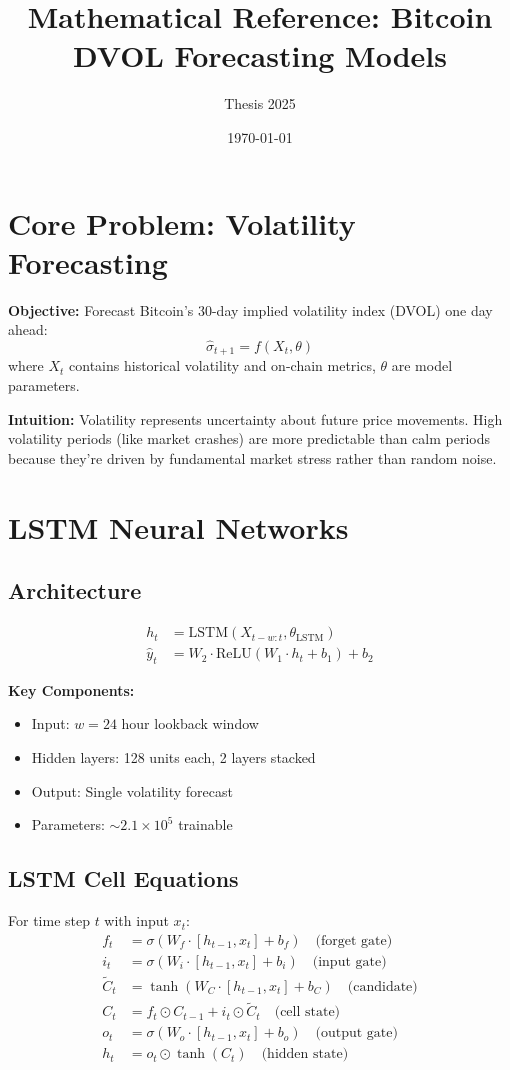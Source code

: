 \documentclass{article}
\title{Mathematical Reference: Bitcoin DVOL Forecasting Models}
\author{Thesis 2025}
\date{\today}
\begin{document}
\maketitle

\section{Core Problem: Volatility Forecasting}

\textbf{Objective:} Forecast Bitcoin's 30-day implied volatility index (DVOL) one day ahead:
\begin{equation}
\hat{\sigma}_{t+1} = f(X_t, \theta)
\end{equation}
where $X_t$ contains historical volatility and on-chain metrics, $\theta$ are model parameters.

\textbf{Intuition:} Volatility represents uncertainty about future price movements. High volatility periods (like market crashes) are more predictable than calm periods because they're driven by fundamental market stress rather than random noise.

\section{LSTM Neural Networks}

\subsection{Architecture}
\begin{align}
h_t &= \text{LSTM}(X_{t-w:t}, \theta_{\text{LSTM}}) \\
\hat{y}_t &= W_2 \cdot \text{ReLU}(W_1 \cdot h_t + b_1) + b_2
\end{align}

\textbf{Key Components:}
\begin{itemize}
\item Input: $w = 24$ hour lookback window
\item Hidden layers: 128 units each, 2 layers stacked
\item Output: Single volatility forecast
\item Parameters: $\sim 2.1 \times 10^5$ trainable
\end{itemize}

\subsection{LSTM Cell Equations}
For time step $t$ with input $x_t$:
\begin{align}
f_t &= \sigma(W_f \cdot [h_{t-1}, x_t] + b_f) \quad \text{(forget gate)} \\
i_t &= \sigma(W_i \cdot [h_{t-1}, x_t] + b_i) \quad \text{(input gate)} \\
\tilde{C}_t &= \tanh(W_C \cdot [h_{t-1}, x_t] + b_C) \quad \text{(candidate)} \\
C_t &= f_t \odot C_{t-1} + i_t \odot \tilde{C}_t \quad \text{(cell state)} \\
o_t &= \sigma(W_o \cdot [h_{t-1}, x_t] + b_o) \quad \text{(output gate)} \\
h_t &= o_t \odot \tanh(C_t) \quad \text{(hidden state)}
\end{align}
\end{document}
